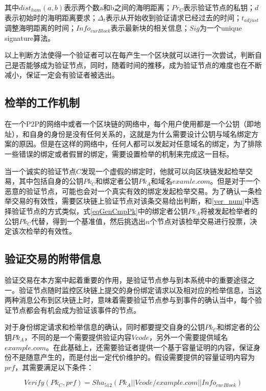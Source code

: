其中$dist_{ham}(a,b)$表示两个数a和b之间的海明距离；$Pr_C$表示验证节点的私钥；$d$表示初始时的海明距离要求；$\Delta_t$表示从开始收到验证请求已经过去的时间；$t_{adjust}$调整海明距离的时间；$Info_{curBlock}$表示最新块的相关信息；$Sig$为一个unique signature算法。

以上判断方法使得一个验证者可以在每产生一个区块就可以进行一次尝试，判断自己是否能够成为验证节点，同时，随着时间的推移，成为验证节点的难度也在不断减小，保证一定会有验证者被选出。



\subsection{检举的工作机制}

在一个P2P的网络中或者一个区块链的网络中，每个用户使用都是一个公钥（即地址），和自身的身份是没有任何关系的，这就是为什么需要设计公钥与域名绑定方案的原因。但是在这样的网络中，任何人都可以发起对任意域名的绑定，为了排除一些错误的绑定或者假冒的绑定，需要设置检举的机制来完成这一目标。

当一个诚实的验证节点$C$发现一个虚假的绑定时，他就可以向区块链发起检举交易，其中包括自身的公钥$Pk_C$和绑定者公钥$Pk_A$和域名$examle.com$。但是对于一个恶意的验证节点，可能也会对一个真实有效的绑定发起检举交易。为了确认一条检举交易的有效性，需要区块链上验证节点对该条交易给出判断，和\ref{ver_num}中选择验证节点的方式类似，式\ref{eqGenCmpPk}中的绑定者公钥$Pk_A$将被发起检举者的公钥$Pk_C$代替，得到一个基准值，然后挑选出$n$个节点对该检举交易进行投票，决定该次检举的有效性。


\subsection{验证交易的附带信息}

验证交易在本方案中起着重要的作用，是验证节点参与到本系统中的重要途径之一。验证节点随时监控区块链上提交的身份绑定请求以及相对应的检举信息，当这两种消息公布到区块链上时，意味着需要验证节点参与到事件的确认当中，每个验证节点都会有机会成为验证该事件的节点。

对于身份绑定请求和检举信息的确认，同时都要提交自身的公钥$Pk_C$和绑定者的公钥$Pk_A$，不同的是一个需要提供验证内容$Vcode$，另外一个需要提供域名$example.com$。在此基础上，还需要验证者提供一个基于容量证明的内容，保证身份不是随意产生的，而是付出一定代价维护的。假设需要提供的容量证明内容为$prf$，其需要满足以下条件：

\begin{equation}\label{pocVerify}
Verify(Pk_C, prf) = Sha_{512}(Pk_A||Vcode/example.com||Info_{curBlock})
\end{equation}

